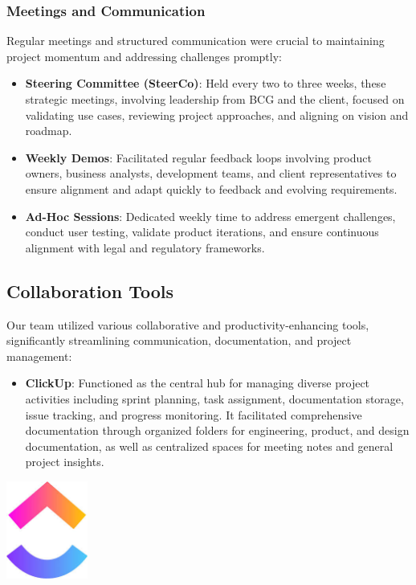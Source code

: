 \subsubsection{Meetings and Communication}
Regular meetings and structured communication were crucial to maintaining project momentum and addressing challenges promptly:

\begin{itemize}
    \item \textbf{Steering Committee (SteerCo)}: Held every two to three weeks, these strategic meetings, involving leadership from BCG and the client, focused on validating use cases, reviewing project approaches, and aligning on vision and roadmap.
    \item \textbf{Weekly Demos}: Facilitated regular feedback loops involving product owners, business analysts, development teams, and client representatives to ensure alignment and adapt quickly to feedback and evolving requirements.
    \item \textbf{Ad-Hoc Sessions}: Dedicated weekly time to address emergent challenges, conduct user testing, validate product iterations, and ensure continuous alignment with legal and regulatory frameworks.
\end{itemize}

\subsection{Collaboration Tools}
Our team utilized various collaborative and productivity-enhancing tools, significantly streamlining communication, documentation, and project management:

\begin{itemize}
    \item \textbf{ClickUp}: Functioned as the central hub for managing diverse project activities including sprint planning, task assignment, documentation storage, issue tracking, and progress monitoring. It facilitated comprehensive documentation through organized folders for engineering, product, and design documentation, as well as centralized spaces for meeting notes and general project insights.
\end{itemize}

\begin{center}
    \centering
    \includegraphics[width=0.2\textwidth]{Images/ClickUp Logo.jpeg}
     \cite{clickup_logo}
    \label{fig:clickup_logo}
\end{center}

